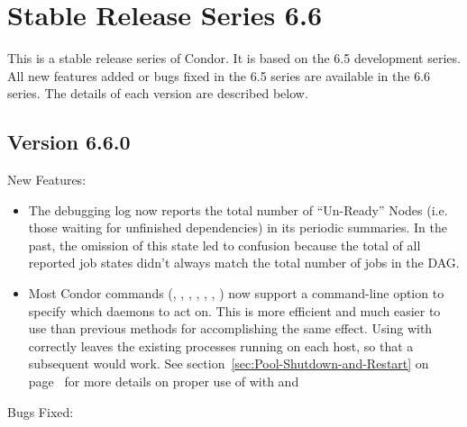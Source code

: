 \section{\label{sec:History-6-6}Stable Release Series 6.6}

This is a stable release series of Condor.
It is based on the 6.5 development series.
All new features added or bugs fixed in the 6.5 series are available
in the 6.6 series.
The details of each version are described below.

\subsection{\label{sec:New-6-6-0}Version 6.6.0}

\noindent New Features:

\begin{itemize}

\item The  debugging log now reports the total number
      of ``Un-Ready'' Nodes (i.e. those waiting for unfinished
      dependencies) in its periodic summaries.  In the past, the
      omission of this state led to confusion because the total of all
      reported job states didn't always match the total number of jobs
      in the DAG.

\item Most Condor commands (, ,
  , , ,
  , ) now support a 
  command-line option to specify which daemons to act on.
  This is more efficient and much easier to use than previous methods
  for accomplishing the same effect.
  Using  with  correctly leaves the existing
   processes running on each host, so that a subsequent
   would work.
  See section~\ref{sec:Pool-Shutdown-and-Restart} on
  page~\pageref{sec:Pool-Shutdown-and-Restart} for more details on
  proper use of  with  and 

\end{itemize}

\noindent Bugs Fixed:

